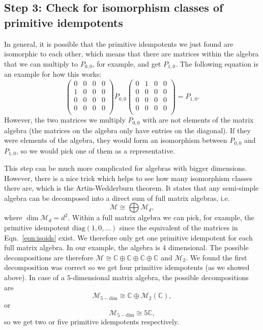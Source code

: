 \subsection*{Step 3: Check for isomorphism classes of primitive idempotents} In general, it is possible that the primitive idempotents we just found are isomorphic to each other, which means that there are matrices within the algebra that we can multiply to $P_{0,0}$, for example, and get $P_{1,0}$. The following equation is an example for how this works:
	\begin{equation}
		\begin{pmatrix} 0 & 0 & 0 & 0\\ 1 & 0 & 0 & 0\\ 0 & 0 & 0 & 0\\ 0 & 0 & 0 & 0\\ \end{pmatrix}P_{0,0} \begin{pmatrix} 0 & 1 & 0 & 0\\ 0 & 0 & 0 & 0\\ 0 & 0 & 0 & 0\\ 0 & 0 & 0 & 0\\ \end{pmatrix}=P_{1,0}.\label{eqn:isoids}
	\end{equation}
However, the two matrices we multiply $P_{0,0}$ with are not elements of the matrix algebra (the matrices on the algebra only have entries on the diagonal). If they were elements of the algebra, they would form an isomorphism between $P_{0,0}$ and $P_{1,0}$, so we would pick one of them as a representative.

This step can be much more complicated for algebras with bigger dimensions. However, there is a nice trick which helps to see how many isomorphism classes there are, which is the Artin-Wedderburn theorem. It states that any semi-simple algebra can be decomposed into a direct sum of full matrix algebras, i.e.
	\begin{equation}
		\mathcal{M}\cong\bigoplus\mathcal{M}_d,
	\end{equation}
	where $\dim{\mathcal{M}_d}=d^2$. Within a full matrix algebra we can pick, for example, the primitive idempotent $\mathrm{diag}(1,0,\ldots)$ since the equivalent of the matrices in Eqn.~\ref{eqn:isoids} exist. We therefore only get one primitive idempotent for each full matrix algebra. In our example, the algebra is 4 dimensional. The possible decompositions are therefore 
	$\mathcal{M}\cong\mathbb{C}\oplus\mathbb{C}\oplus\mathbb{C}\oplus\mathbb{C}$ and $\mathcal{M}_2$. We found the first decomposition was correct so we get four primitive idempotents (as we showed above). 
	In case of a $5$-dimensional matrix algebra, the possible decompositions are
	\begin{equation}
		\mathcal{M}_{5-\mathrm{dim}}\cong\mathbb{C}\oplus\mathcal{M}_2(\mathbb{C}),
	\end{equation}
	or 
	\begin{equation}
		\mathcal{M}_{5-\mathrm{dim}}\cong5\mathbb{C},
	\end{equation}
so we get two or five primitive idempotents respectively.
	
